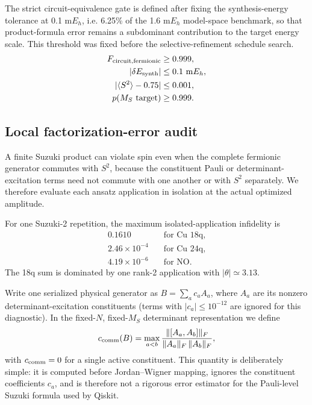 \documentclass[
 aip,
 jcp,
 amsmath,amssymb,
 preprint
]{revtex4-2}
\begin{document}
The strict circuit-equivalence gate is defined after fixing the synthesis-energy tolerance at
0.1 m$E_h$, i.e. 6.25\% of the 1.6 m$E_h$ model-space benchmark, so that product-formula error
remains a subdominant contribution to the target energy scale. This threshold was fixed
before the selective-refinement schedule search.
\begin{align}
F_{\rm circuit,fermionic}&\ge0.999,\\
|\delta E_{\rm synth}|&\le0.1~{\rm m}E_h,\\
|\langle S^2\rangle-0.75|&\le0.001,\\
p(M_S{\rm\ target})&\ge0.999.
\end{align}

\subsection{Local factorization-error audit}

A finite Suzuki product can violate spin even when the complete fermionic generator commutes with $S^2$, because the constituent Pauli or determinant-excitation terms need not commute with one another or with $S^2$ separately.
We therefore evaluate each ansatz application in isolation at the actual optimized amplitude.

For one Suzuki-2 repetition, the maximum isolated-application infidelity is
\begin{align}
0.1610 &\quad\text{for Cu 18q},\\
2.46\times10^{-4} &\quad\text{for Cu 24q},\\
4.19\times10^{-6} &\quad\text{for NO}.
\end{align}
The 18q sum is dominated by one rank-2 application with $|\theta|\simeq3.13$.

Write one serialized physical generator as $B=\sum_a c_aA_a$, where $A_a$ are its nonzero determinant-excitation constituents (terms with $|c_a|\le10^{-12}$ are ignored for this diagnostic).
In the fixed-$N$, fixed-$M_S$ determinant representation we define
\begin{equation}
c_{\rm comm}(B)
=
\max_{a<b}
\frac{\|[A_a,A_b]\|_F}
{\|A_a\|_F\,\|A_b\|_F},
\label{eq:ccomm}
\end{equation}
with $c_{\rm comm}=0$ for a single active constituent.
This quantity is deliberately simple: it is computed before Jordan--Wigner mapping, ignores the constituent coefficients $c_a$, and is therefore not a rigorous error estimator for the Pauli-level Suzuki formula used by Qiskit.
\end{document}
